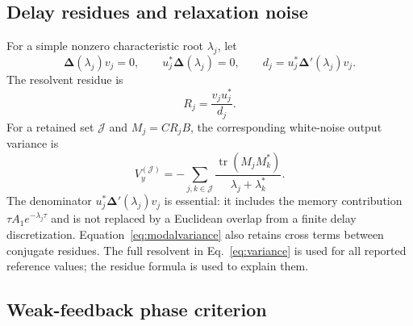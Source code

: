 \documentclass{optica-article}
\newcommand{\Tr}{\operatorname{tr}}
\newcommand{\Dmat}{\bm{\Delta}}
\begin{document}
\subsection{Delay residues and relaxation noise}

For a simple nonzero characteristic root $\lambda_j$, let
\begin{equation}
 \Dmat(\lambda_j)v_j=0,\qquad u_j^*\Dmat(\lambda_j)=0,
 \qquad d_j=u_j^*\Dmat'(\lambda_j)v_j.
\end{equation}
The resolvent residue is
\begin{equation}
 R_j=\frac{v_ju_j^*}{d_j}.
 \label{eq:residue}
\end{equation}
For a retained set $\mathcal J$ and $M_j=CR_jB$, the corresponding white-noise output variance is
\begin{equation}
 V_y^{(\mathcal J)}=-\sum_{j,k\in\mathcal J}
 \frac{\Tr(M_jM_k^*)}{\lambda_j+\lambda_k^*}.
 \label{eq:modalvariance}
\end{equation}
The denominator $u_j^*\Dmat'(\lambda_j)v_j$ is essential: it includes the memory contribution $\tau A_1e^{-\lambda_j\tau}$ and is not replaced by a Euclidean overlap from a finite delay discretization. Equation~\eqref{eq:modalvariance} also retains cross terms between conjugate residues. The full resolvent in Eq.~\eqref{eq:variance} is used for all reported reference values; the residue formula is used to explain them.

\subsection{Weak-feedback phase criterion}
\end{document}
